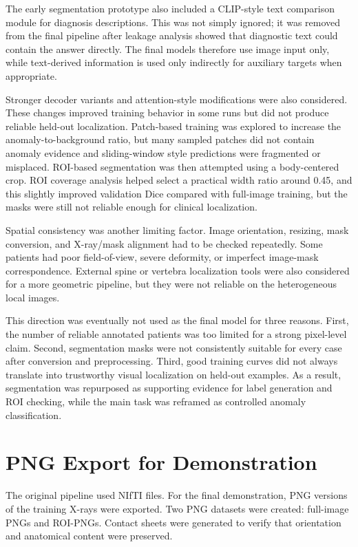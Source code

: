 The early segmentation prototype also included a CLIP-style text comparison module for diagnosis descriptions. This was not simply ignored; it was removed from the final pipeline after leakage analysis showed that diagnostic text could contain the answer directly. The final models therefore use image input only, while text-derived information is used only indirectly for auxiliary targets when appropriate.

Stronger decoder variants and attention-style modifications were also considered. These changes improved training behavior in some runs but did not produce reliable held-out localization. Patch-based training was explored to increase the anomaly-to-background ratio, but many sampled patches did not contain anomaly evidence and sliding-window style predictions were fragmented or misplaced. ROI-based segmentation was then attempted using a body-centered crop. ROI coverage analysis helped select a practical width ratio around 0.45, and this slightly improved validation Dice compared with full-image training, but the masks were still not reliable enough for clinical localization.

Spatial consistency was another limiting factor. Image orientation, resizing, mask conversion, and X-ray/mask alignment had to be checked repeatedly. Some patients had poor field-of-view, severe deformity, or imperfect image-mask correspondence. External spine or vertebra localization tools were also considered for a more geometric pipeline, but they were not reliable on the heterogeneous local images.

This direction was eventually not used as the final model for three reasons. First, the number of reliable annotated patients was too limited for a strong pixel-level claim. Second, segmentation masks were not consistently suitable for every case after conversion and preprocessing. Third, good training curves did not always translate into trustworthy visual localization on held-out examples. As a result, segmentation was repurposed as supporting evidence for label generation and ROI checking, while the main task was reframed as controlled anomaly classification.

\section{PNG Export for Demonstration}
The original pipeline used NIfTI files. For the final demonstration, PNG versions of the training X-rays were exported. Two PNG datasets were created: full-image PNGs and ROI-PNGs. Contact sheets were generated to verify that orientation and anatomical content were preserved.

